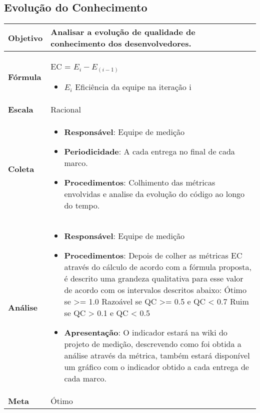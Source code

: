\subsection{Evolução do Conhecimento}

	\begin{tabular}{ |p{3cm}|p{12cm}| }      
	 \hline
    \textbf{Objetivo} & Analisar a evolução de qualidade de conhecimento dos desenvolvedores. \\
   \hline
    \textbf{Fórmula} & EC = $E_i - E_(i-1)$ \begin{itemize}
			\item $E_i$ Eficiência da equipe na iteração i
		\end{itemize}\\
   \hline
    \textbf{Escala} & Racional \\
   \hline
    \textbf{Coleta} & \begin{itemize}
		 \item \textbf{Responsável}: Equipe de medição
     \item \textbf{Periodicidade}: A cada entrega no final de cada marco.
     \item \textbf{Procedimentos}: Colhimento das métricas envolvidas e analise da evolução do código ao longo do tempo.
    \end{itemize} \\
   \hline
    \textbf{Análise} & \begin{itemize} \item \textbf{Responsável}: Equipe de medição
    \item \textbf{Procedimentos}: Depois de colher as métricas EC através do cálculo de acordo com a fórmula proposta, é descrito uma grandeza qualitativa para esse valor de acordo com os intervalos descritos abaixo:
		 \subitem Ótimo se  >= 1.0
		 \subitem Razoável se QC >= 0.5 e QC < 0.7
		 \subitem Ruim se QC > 0.1 e QC < 0.5
	\item \textbf{Apresentação}: O indicador estará na wiki do projeto de medição, descrevendo como foi obtida a análise através da métrica, também estará disponível um gráfico com o indicador obtido a cada entrega de cada marco.
	\end{itemize} \\
  \hline
	 \textbf{Meta} & Ótimo \\
	\hline

\end{tabular}
